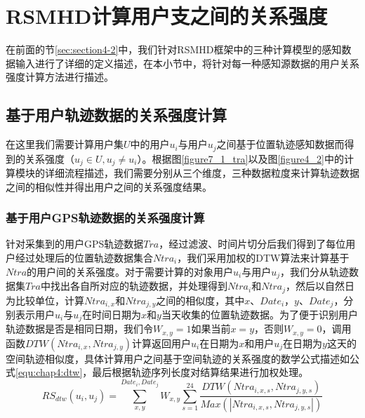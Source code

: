 \section{RSMHD计算用户支之间的关系强度}
\label{sec:section4-3}
在前面的节\ref{sec:section4-2}中，我们针对RSMHD框架中的三种计算模型的感知数据输入进行了详细的定义描述，在本小节中，将针对每一种感知源数据的用户关系强度计算方法进行描述。
\subsection{基于用户轨迹数据的关系强度计算}
在这里我们需要计算用户集$U$中的用户$u_{i}$与用户$u_{j}$之间基于位置轨迹感知数据而得到的关系强度（$u_{j} \in U,u_{j} \neq u_{i}$）。根据图\ref{figure7_1_tra}以及图\ref{figure4_2}中的计算模块的详细流程描述，我们需要分别从三个维度，三种数据粒度来计算轨迹数据之间的相似性并得出用户之间的关系强度结果。
\subsubsection{基于用户GPS轨迹数据的关系强度计算}
针对采集到的用户GPS轨迹数据$Tra$，经过滤波、时间片切分后我们得到了每位用户经过处理后的位置轨迹数据集合$Ntra_{i}$，我们采用加权的DTW算法来计算基于$Ntra$的用户间的关系强度。对于需要计算的对象用户$u_{i}$与用户$u_{j}$，我们分从轨迹数据集$Tra$中找出各自所对应的轨迹数据，并处理得到$Ntra_{i}$和$Ntra_{j}$，然后以自然日为比较单位，计算$Ntra_{i,x}$和$Ntra_{j,y}$之间的相似度，其中$x 、 Date_{i}$，$y 、 Date_{j}$，分别表示用户$u_{i}$与$u_{j}$在时间日期为$x$和$y$当天收集的位置轨迹数据。为了便于识别用户轨迹数据是否是相同日期，我们令$W_{x,y}=1$如果当前$x=y$，否则$W_{x,y}=0$，调用函数$DTW(Ntra_{i,x},Ntra_{j,y})$计算返回用户$u_{i}$在日期为$x$和用户$u_{j}$在日期为$y$这天的空间轨迹相似度，具体计算用户之间基于空间轨迹的关系强度的数学公式描述如公式\ref{equ:chap4:dtw}，最后根据轨迹序列长度对结算结果进行加权处理。
\begin{equation}
\label{equ:chap4:dtw}
RS_{dtw}(u_{i},u_{j})=\sum_{x ,y }^{ Date_{i}, Date_{j}}W_{x,y}\sum_{s=1}^{24} \frac{DTW(Ntra_{i,x,s},Ntra_{j,y,s})}{Max(\left | Ntra_{i,x,s},Ntra_{j,y,s}  \right |)}
\end{equation}
